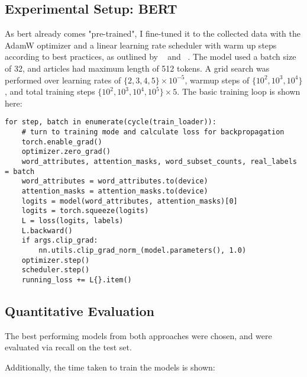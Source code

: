 \subsection{Experimental Setup: BERT}
As \acrshort{bert} already comes "pre-trained", I fine-tuned it to the collected data with the AdamW optimizer and a linear learning rate scheduler with warm up steps according to best practices, as outlined by ~\textcite{devlin2019bert:} and ~\textcite{wolf2019huggingfaces}. The model used a batch size of 32, and articles had maximum length of 512 tokens. A grid search was performed over learning rates of $\{2, 3, 4, 5\} \times 10^{-5}$, warmup steps of $\{10^2, 10^3, 10^4\}$, and total training steps $\{10^2, 10^3, 10^4, 10^5\} \times 5$. The basic training loop is shown here:
\begin{verbatim}
for step, batch in enumerate(cycle(train_loader)):
    # turn to training mode and calculate loss for backpropagation
    torch.enable_grad()
    optimizer.zero_grad()
    word_attributes, attention_masks, word_subset_counts, real_labels = batch
    word_attributes = word_attributes.to(device)
    attention_masks = attention_masks.to(device)
    logits = model(word_attributes, attention_masks)[0]
    logits = torch.squeeze(logits)
    L = loss(logits, labels)
    L.backward()
    if args.clip_grad:
        nn.utils.clip_grad_norm_(model.parameters(), 1.0)
    optimizer.step()
    scheduler.step()
    running_loss += L{}.item()
\end{verbatim}

\subsection{Quantitative Evaluation}
The best performing models from both approaches were chosen, and were evaluated via recall on the test set.


Additionally, the time taken to train the models is shown:

